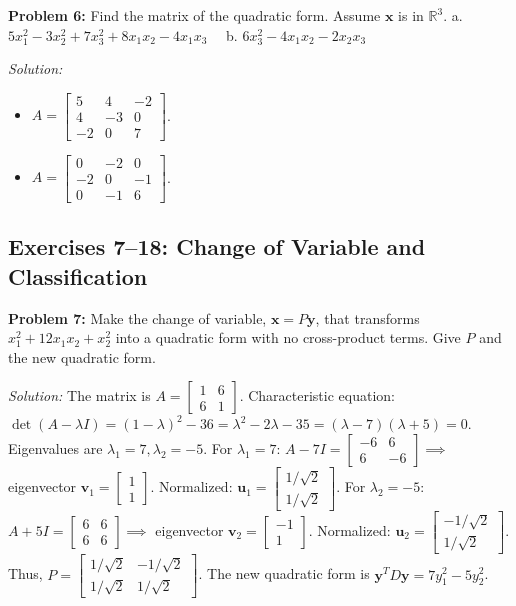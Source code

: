 \documentclass[11pt, letterpaper]{article}
\theoremstyle{definition}
\theoremstyle{remark}
\newcommand{\R}{\mathbb{R}}
\newcommand{\x}{\mathbf{x}}
\newcommand{\y}{\mathbf{y}}
\begin{document}
\textbf{Problem 6:} Find the matrix of the quadratic form. Assume $\x$ is in $\R^3$.
a. $5x_1^2 - 3x_2^2 + 7x_3^2 + 8x_1 x_2 - 4x_1 x_3 \quad$ b. $6x_3^2 - 4x_1 x_2 - 2x_2 x_3$

\textit{Solution:}
\begin{itemize}
    \item[\textbf{a.}] $A = \begin{bmatrix} 5 & 4 & -2 \\ 4 & -3 & 0 \\ -2 & 0 & 7 \end{bmatrix}$.
    \item[\textbf{b.}] $A = \begin{bmatrix} 0 & -2 & 0 \\ -2 & 0 & -1 \\ 0 & -1 & 6 \end{bmatrix}$.
\end{itemize}

\subsection{Exercises 7--18: Change of Variable and Classification}

\textbf{Problem 7:} Make the change of variable, $\x = P\y$, that transforms $x_1^2 + 12x_1 x_2 + x_2^2$ into a quadratic form with no cross-product terms. Give $P$ and the new quadratic form.

\textit{Solution:}
The matrix is $A = \begin{bmatrix} 1 & 6 \\ 6 & 1 \end{bmatrix}$. 
Characteristic equation: $\det(A - \lambda I) = (1-\lambda)^2 - 36 = \lambda^2 - 2\lambda - 35 = (\lambda - 7)(\lambda + 5) = 0$.
Eigenvalues are $\lambda_1 = 7, \lambda_2 = -5$.
For $\lambda_1 = 7$: $A - 7I = \begin{bmatrix} -6 & 6 \\ 6 & -6 \end{bmatrix} \implies$ eigenvector $\mathbf{v}_1 = \begin{bmatrix} 1 \\ 1 \end{bmatrix}$. Normalized: $\mathbf{u}_1 = \begin{bmatrix} 1/\sqrt{2} \\ 1/\sqrt{2} \end{bmatrix}$.
For $\lambda_2 = -5$: $A + 5I = \begin{bmatrix} 6 & 6 \\ 6 & 6 \end{bmatrix} \implies$ eigenvector $\mathbf{v}_2 = \begin{bmatrix} -1 \\ 1 \end{bmatrix}$. Normalized: $\mathbf{u}_2 = \begin{bmatrix} -1/\sqrt{2} \\ 1/\sqrt{2} \end{bmatrix}$.
Thus, $P = \begin{bmatrix} 1/\sqrt{2} & -1/\sqrt{2} \\ 1/\sqrt{2} & 1/\sqrt{2} \end{bmatrix}$. The new quadratic form is $\y^T D \y = 7y_1^2 - 5y_2^2$.
\end{document}
